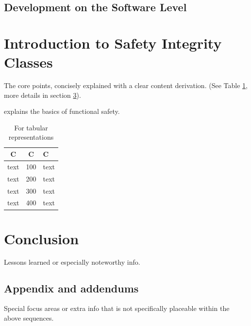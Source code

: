 \documentclass[a4paper,11pt,twoside]{article}
\begin{document}
\subsection{Development on the Software Level}


\section{Introduction to Safety Integrity Classes}

The core points, concisely explained with a clear content derivation. (See Table \ref{tab:boringdetails}, more details in section \ref{sec:details}).

explains the basics of functional safety.

\begin{table}[h]
\centering
\label{tab:boringdetails}
\begin{tabular}{|c|c|l|} \hline
C & C & C\\ \hline\hline
text & 100 & text \\ \hline
text & 200 & text \\ \hline
text & 300 & text \\ \hline
text & 400 & text \\ \hline
\end{tabular}
\caption{For tabular representations}
\end{table}

% 

\section{Conclusion}

Lessons learned or especially noteworthy info.








\begin{appendix}
\section{Appendix and addendums}
\label{sec:details}

%	

Special focus areas or extra info that is not specifically placeable within the above sequences.

\end{appendix}
\end{document}

